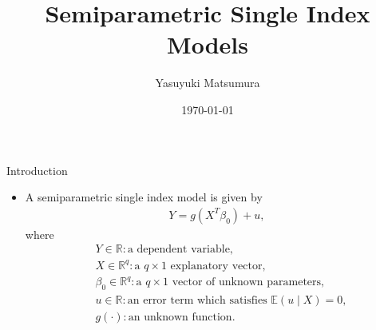 \documentclass[xcolor=svgnames,dvipdfmx,cjk]{beamer}
\theoremstyle{example}
\begin{document}
 

\title[Li and Racine (2007, Chapter 8)]{Semiparametric Single Index Models} 
\author[Y. Matsumura]{Yasuyuki Matsumura}          
\date{\today}


\begin{frame}                  
\titlepage                     
\end{frame}


\begin{frame}                  
\tableofcontents
\end{frame}


\begin{frame}{Introduction}
  \begin{itemize}
    \item  A semiparametric single index model is given by 
            \begin{align*}
              Y = g (X^{T} \beta_0) + u,
            \end{align*}
           where  
            \begin{align*}
              & Y \in \mathbb{R}: \text{a dependent variable}, \\
              & X \in \mathbb{R}^{q}: \text{a }  q \times 1 \text{ explanatory vector}, \\
              & \beta_0 \in \mathbb{R}^{q}: \text{a }  q \times 1 \text{ vector of unknown parameters}, \\
              & u \in \mathbb{R}: \text{an error term which satisfies } \mathbb{E}(u \mid X) =0, \\
              & g(\cdot): \text{an unknown function}.
            \end{align*}
  \end{itemize}
\end{frame}
\end{document}
